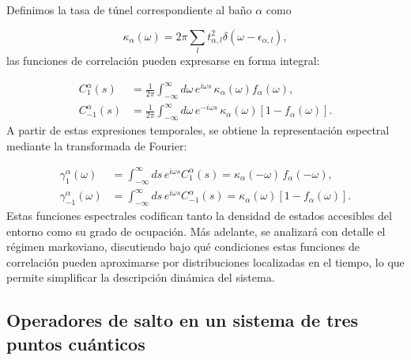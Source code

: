 \begin{appendixs}
Definimos la tasa de túnel correspondiente al baño $\alpha$ como

\begin{equation*}
    \kappa_{\alpha}(\omega) = 2\pi \sum_{l} t_{\alpha,l}^{2} \delta(\omega - \epsilon_{\alpha,l}),
\end{equation*}
las funciones de correlación pueden expresarse en forma integral:

\begin{align*}
    C_{1}^{\alpha}(s) &= \frac{1}{2\pi} \int_{-\infty}^{\infty} d\omega\, e^{i\omega s}\, \kappa_{\alpha}(\omega) f_{\alpha}(\omega), \\
    C_{-1}^{\alpha}(s) &= \frac{1}{2\pi} \int_{-\infty}^{\infty} d\omega\, e^{-i\omega s}\, \kappa_{\alpha}(\omega)\left[1 - f_{\alpha}(\omega)\right].
\end{align*}
A partir de estas expresiones temporales, se obtiene la representación espectral mediante la transformada de Fourier:

\begin{align*}
    \gamma_{1}^{\alpha}(\omega) &= \int_{-\infty}^{\infty} ds\, e^{i \omega s} C_{1}^{\alpha}(s) 
    = \kappa_{\alpha}(-\omega)\, f_{\alpha}(-\omega), \\
    \gamma_{-1}^{\alpha}(\omega) &= \int_{-\infty}^{\infty} ds\, e^{i \omega s} C_{-1}^{\alpha}(s) 
    = \kappa_{\alpha}(\omega)\left[1 - f_{\alpha}(\omega)\right].
\end{align*}
Estas funciones espectrales codifican tanto la densidad de estados accesibles del entorno como su grado de ocupación.  
Más adelante, se analizará con detalle el régimen markoviano, discutiendo bajo qué condiciones estas funciones de correlación pueden aproximarse por distribuciones localizadas en el tiempo, lo que permite simplificar la descripción dinámica del sistema.

\label{apendix5bathcorre}


\subsection{Operadores de salto en un sistema de tres puntos cuánticos}
\label{apendix5jumpop}


\end{appendixs}
